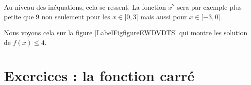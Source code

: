 Au niveau des inéquations, cela se ressent. La fonction \( x^2\) sera par exemple plus petite que \( 9\) non seulement pour les \( x\in\mathopen[ 0 , 3 \mathclose]\) mais aussi pour \( x\in\mathopen[ -3 , 0 \mathclose]\).

Nous voyons cela sur la figure \ref{LabelFigfigureEWDVDTS} qui montre les solution de \( f(x)\leq 4\). %
\newcommand{\CaptionFigfigureEWDVDTS}{La résulution graphique d'une inéquation avec la fonction carré.}


\section{Exercices : la fonction carré}


